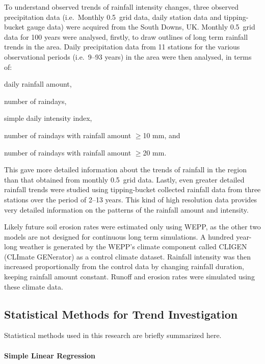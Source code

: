 To understand observed trends of rainfall intensity changes, three observed
precipitation data (i.e.\ Monthly 0.5\textdegree\ grid data, daily station data
and tipping-bucket gauge data) were acquired from the South Downs, UK. Monthly
0.5\textdegree\ grid data for 100 years were analysed, firstly, to draw outlines
of long term rainfall trends in the area. Daily precipitation data from 11
stations for the various observational periods (i.e.\ 9--93 years) in the area
were then analysed, in terms of:
\begin{itemize*}
 \item daily rainfall amount,
 \item number of raindays,
 \item simple daily intensity index,
 \item number of raindays with rainfall amount $\geq$10 mm, and
 \item number of raindays with rainfall amount $\geq$20 mm.
\end{itemize*}
This gave more detailed information about the trends of rainfall in the region
than that obtained from monthly 0.5\textdegree\ grid data. Lastly, even greater
detailed rainfall trends were studied using tipping-bucket collected rainfall
data from three stations over the period of 2--13 years. This kind of high
resolution data provides very detailed information on the patterns of the
rainfall amount and intensity.

Likely future soil erosion rates were estimated only using WEPP, as the other
two models are not designed for continuous long term simulations. A hundred
year-long weather is generated by the WEPP's climate component called CLIGEN
(CLImate GENerator) as a control climate dataset. Rainfall intensity was
then increased proportionally from the control data by changing rainfall
duration, keeping rainfall amount constant. Runoff and erosion rates were
simulated using these climate data.

\subsection{Statistical Methods for Trend Investigation}
\label{StatisticalMethodsForTrendInvestigation}

Statistical methods used in this research are briefly summarized here.

\paragraph{Simple Linear Regression}
\label{sec:SimpleLinearRegression}

